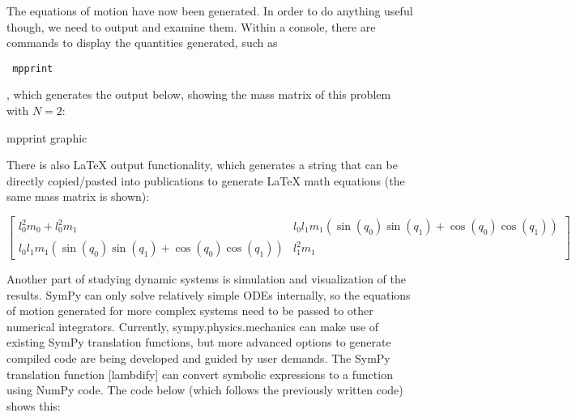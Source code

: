 \documentclass[twocolumn,10pt]{asme2e}
\begin{document}
The equations of motion have now been generated.
In order to do anything useful though, we need to output and examine them.
Within a console, there are commands to display the quantities generated, such
as \begin{verbatim} mpprint \end{verbatim}, which generates the output below, showing the mass matrix of this
problem with $N=2$:

mpprint graphic

There is also LaTeX output functionality, which generates a string that can be
directly copied/pasted into publications to generate LaTeX math equations (the
same mass matrix is shown):

\begin{equation}
\left[\begin{smallmatrix}l_{0}^{2} m_{0} + l_{0}^{2} m_{1} & l_{0} l_{1} m_{1}
\left(\operatorname{sin}\left(q_{0}\right) \operatorname{sin}\left(q_{1}\right)
+ \operatorname{cos}\left(q_{0}\right)
\operatorname{cos}\left(q_{1}\right)\right)\\l_{0} l_{1} m_{1}
\left(\operatorname{sin}\left(q_{0}\right) \operatorname{sin}\left(q_{1}\right)
+ \operatorname{cos}\left(q_{0}\right)
\operatorname{cos}\left(q_{1}\right)\right) & l_{1}^{2}
m_{1}\end{smallmatrix}\right]
\end{equation}

Another part of studying dynamic systems is simulation and visualization of the
results.
SymPy can only solve relatively simple ODEs internally, so the equations of
motion generated for more complex systems need to be passed to other numerical
integrators.
Currently, sympy.physics.mechanics can make use of existing SymPy translation
functions, but more advanced options to generate compiled code are being
developed and guided by user demands.
The SymPy translation function [lambdify] can convert symbolic expressions to a
function using NumPy code.
The code below (which follows the previously written code) shows this:
\end{document}
